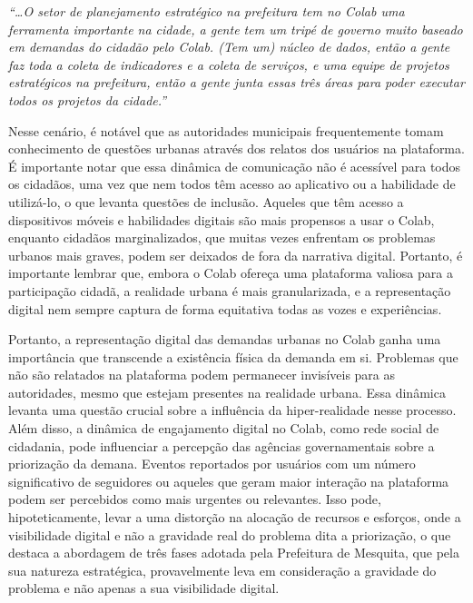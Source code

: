 \begin{citacao}
	\textit{“…O setor de planejamento estratégico na prefeitura tem no Colab uma ferramenta importante na cidade, a gente tem um tripé de governo muito baseado em demandas do cidadão pelo Colab. (Tem um) núcleo de dados, então a gente faz toda a coleta de indicadores e a coleta de serviços, e uma equipe de projetos estratégicos na prefeitura, então a gente junta essas três áreas para poder executar todos os projetos da cidade.”}
\end{citacao}

Nesse cenário, é notável que as autoridades municipais frequentemente tomam conhecimento de questões urbanas através dos relatos dos usuários na plataforma. É importante notar que essa dinâmica de comunicação não é acessível para todos os cidadãos, uma vez que nem todos têm acesso ao aplicativo ou a habilidade de utilizá-lo, o que levanta questões de inclusão. Aqueles que têm acesso a dispositivos móveis e habilidades digitais são mais propensos a usar o Colab, enquanto cidadãos marginalizados, que muitas vezes enfrentam os problemas urbanos mais graves, podem ser deixados de fora da narrativa digital. Portanto, é importante lembrar que, embora o Colab ofereça uma plataforma valiosa para a participação cidadã, a realidade urbana é mais granularizada, e a representação digital nem sempre captura de forma equitativa todas as vozes e experiências.

Portanto, a representação digital das demandas urbanas no Colab ganha uma importância que transcende a existência física da demanda em si. Problemas que não são relatados na plataforma podem permanecer invisíveis para as autoridades, mesmo que estejam presentes na realidade urbana. Essa dinâmica levanta uma questão crucial sobre a influência da hiper-realidade nesse processo. Além disso, a dinâmica de engajamento digital no Colab, como rede social de cidadania, pode influenciar a percepção das agências governamentais sobre a priorização da demana. Eventos reportados por usuários com um número significativo de seguidores ou aqueles que geram maior interação na plataforma podem ser percebidos como mais urgentes ou relevantes. Isso pode, hipoteticamente, levar a uma distorção na alocação de recursos e esforços, onde a visibilidade digital e não a gravidade real do problema dita a priorização, o que destaca a abordagem de três fases adotada pela Prefeitura de Mesquita, que pela sua natureza estratégica, provavelmente leva em consideração a gravidade do problema e não apenas a sua visibilidade digital.

